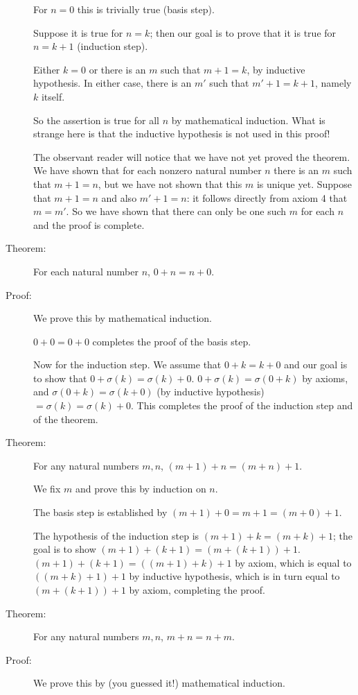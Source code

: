 \documentclass[12pt]{book}
\begin{document}
\begin{description}
For $n=0$ this is trivially true (basis step).

Suppose it is true for $n=k$; then our goal is to prove that it is
true for $n=k+1$ (induction step).

Either $k=0$ or there is an $m$ such that $m+1=k$, by inductive hypothesis.
In either case, there is an $m'$ such that $m'+1 = k+1$, namely $k$ itself.

So the assertion is true for all $n$ by mathematical induction.  What
is strange here is that the inductive hypothesis is not used in this
proof!

The observant reader will notice that we have not yet proved the
theorem.  We have shown that for each nonzero natural number $n$ there
is an $m$ such that $m+1=n$, but we have not shown that this $m$ is
unique yet.  Suppose that $m+1=n$ and also $m'+1=n$: it follows
directly from axiom 4 that $m=m'$.  So we have shown that there can
only be one such $m$ for each $n$ and the proof is complete.

\item[Theorem:]  For each natural number $n$, $0+n=n+0$.

\item[Proof:] We prove this by mathematical induction.

$0+0 = 0+0$ completes the proof of the basis step.

Now for the induction step.  We assume that $0+k=k+0$ and our goal is
to show that $0+\sigma(k) = \sigma(k)+0$.  $0+\sigma(k) = \sigma(0+k)$
by axioms, and $\sigma(0+k) = \sigma(k+0)$ (by inductive hypothesis) $
= \sigma(k) = \sigma(k)+0$.  This completes the proof of the induction
step and of the theorem.

\item[Theorem:]  For any natural numbers $m,n$, $(m+1)+n = (m+n)+1$.

We fix $m$ and prove this by induction on $n$.

The basis step is established by $(m+1)+0 = m+1 = (m+0)+1$.

The hypothesis of the induction step is $(m+1)+k = (m+k)+1$; the goal
is to show $(m+1)+(k+1) = (m+(k+1))+1$.  $(m+1)+(k+1) = ((m+1)+k)+1$
by axiom, which is equal to $((m+k)+1)+1$ by inductive hypothesis,
which is in turn equal to $(m+(k+1))+1$ by axiom, completing the
proof.

\item[Theorem:]  For any natural numbers $m,n$, $m+n=n+m$.

\item[Proof:]  We prove this by (you guessed it!) mathematical induction.


\end{description}
\end{document}
